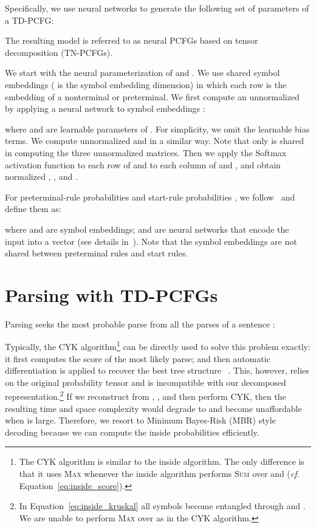 \documentclass[11pt]{article}
\begin{document}
Specifically, we use neural networks to generate the following set of parameters of a TD-PCFG:

The resulting model is referred to as neural PCFGs based on tensor decomposition (TN-PCFGs).

We start with the neural parameterization of  and .
We use shared symbol embeddings  ( is the symbol embedding dimension) in which each row is the embedding of a nonterminal or preterminal.
We first compute an unnormalized  by applying a neural network  to symbol embeddings :

where  and  are learnable parameters of . For simplicity, we omit the learnable bias terms.
We compute unnormalized  and  in a similar way.
Note that only  is shared in computing the three unnormalized matrices.
Then we apply the Softmax activation function to each row of  and to each column of  and ,
and obtain normalized , , and .

For preterminal-rule probabilities  and start-rule probabilities , 
we follow~\cite{kim-etal-2019-compound} and define them as:

where  and  are symbol embeddings;
 and  are neural networks that encode the input into a vector (see details in~\citet{kim-etal-2019-compound}). Note that the symbol embeddings are not shared between preterminal rules and start rules.

\section{Parsing with TD-PCFGs}\label{sec:inference}

Parsing seeks the most probable parse  from all the parses  of a sentence :

Typically, the CYK algorithm\footnote{
	The CYK algorithm is similar to the inside algorithm. The only difference is that it uses \textsc{Max} whenever the inside algorithm performs \textsc{Sum} over  and  (\textit{cf}. Equation~\ref{eq:inside_score}).
} 
can be directly used to solve this problem exactly:
it first computes the score of the most likely parse;
and then automatic differentiation is applied to recover the best tree structure ~\citep{eisner-2016-inside,rush-2020-torch}.
This, however, relies on the original probability tensor  and is incompatible with our decomposed representation.\footnote{
	In Equation~\ref{eq:inside_kruskal} all symbols become entangled through  and .
	We are unable to perform \textsc{Max} over  as in the CYK algorithm.
}
If we reconstruct  from , ,  and then perform CYK, then the resulting time and space complexity would degrade to  and become unaffordable when  is large.
Therefore, we resort to Minimum Bayes-Risk (MBR) style decoding because we can compute the inside probabilities efficiently.
\end{document}
